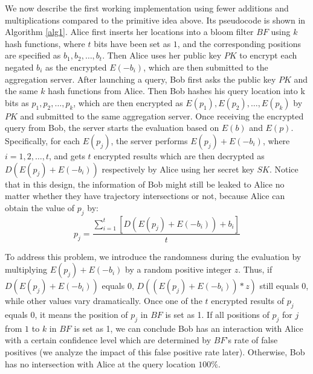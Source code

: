 We now describe the first working implementation using fewer additions and multiplications compared to the primitive idea above. Its pseudocode is shown in Algorithm \ref{alg1}. Alice first inserts her locations into a bloom filter $BF$ using $k$ hash functions, where $t$ bits have been set as $1$, and the corresponding positions are specified as $b_1, b_2, \dots, b_t$. Then Alice uses her public key $PK$ to encrypt each negated $b_i$ as the encrypted $E(-b_i)$, which are then submitted to the aggregation server. After launching a query, Bob first asks the public key $PK$ and the same $k$ hash functions from Alice. Then Bob hashes his query location into k bits as $p_1, p_2, \dots, p_k$, which are then encrypted as $E(p_1), E(p_2), \dots, E(p_k)$ by $PK$ and submitted to the same aggregation server. Once receiving the encrypted query from Bob, the server starts the evaluation based on $E(b)$ and $E(p)$. Specifically, for each $E(p_j)$, the server performs $E(p_j) + E(-b_i)$, where $i = 1, 2, \dots, t$, and gets $t$ encrypted results which are then decrypted as $D(E(p_j) + E(-b_i))$ respectively by Alice using her secret key $SK$. Notice that in this design, the information of Bob might still be leaked to Alice no matter whether they have trajectory intersections or not, because Alice can obtain the value of $p_j$ by:
\begin{equation}
p_j =\frac{\sum_{i = 1}^{t}[D(E(p_j) + E(-b_i)) + b_i]}{t}
\end{equation}

To address this problem, we introduce the randomness during the evaluation by multiplying $E(p_j) + E(-b_i)$ by a random positive integer $z$. Thus, if $D(E(p_j) + E(-b_i))$ equals 0, $D((E(p_j) + E(-b_i))*z)$ still equals 0, while other values vary dramatically. Once one of the $t$ encrypted results of $p_j$ equals 0, it means the position of $p_j$ in $BF$ is set as 1. If all positions of $p_j$ for $j$ from $1$ to $k$ in $BF$ is set as 1, we can conclude Bob has an interaction with Alice with a certain confidence level which are determined by $BF$'s rate of false positives (we analyze the impact of this false positive rate later). Otherwise, Bob has no intersection with Alice at the query location $100\%$.


